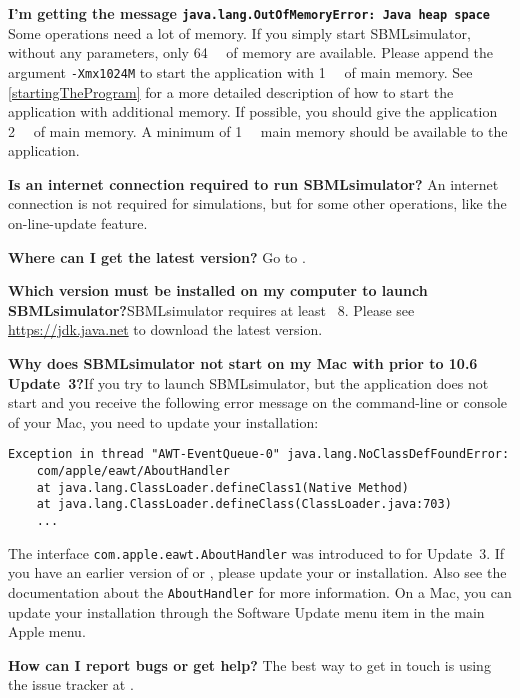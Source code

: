 \noindent \textbf{I'm getting the message \texttt{java.lang.OutOfMemoryError: Java heap space}}\newline
Some operations need a lot of memory. If you simply start SBMLsimulator, without any
\JVM parameters, only \SI{64}{\mega\byte} of memory are available.
Please append the argument \texttt{-Xmx1024M} to start the application with \SI{1}{\giga\byte} of main memory.
See \cref{startingTheProgram} for a more detailed description of how to start the application with additional memory.
If possible, you should give the application \SI{2}{\giga\byte} of main memory.
A minimum of \SI{1}{\giga\byte} main memory should be available to the application.\newline

\noindent \textbf{Is an internet connection required to run SBMLsimulator?}\newline
An internet connection is not required for simulations, but for some other operations,
like the on-line-update feature.\newline

\noindent \textbf{Where can I get the latest version?}\newline
Go to .\newline

\noindent \textbf{Which \Java version must be installed on my computer to launch
SBMLsimulator?}\newline SBMLsimulator requires at least \Java~8.
Please see \url{https://jdk.java.net} to download the latest \Java version.\newline

\noindent \textbf{Why does SBMLsimulator not start on my Mac with \MacOSX prior to
10.6 Update~3?}\newline If you try to launch SBMLsimulator, but the application does
not start and you receive the following error message on the command-line or
\Java console of your Mac, you need to update your \Java installation:
\begin{verbatim}
Exception in thread "AWT-EventQueue-0" java.lang.NoClassDefFoundError:
    com/apple/eawt/AboutHandler
    at java.lang.ClassLoader.defineClass1(Native Method)
    at java.lang.ClassLoader.defineClass(ClassLoader.java:703)
    ...
\end{verbatim}
The interface \texttt{com.apple.eawt.AboutHandler} was introduced to \Java for
 Update~3. If you have an earlier version of \MacOSX or \Java,
please update your \OS or \Java installation. Also see the \MacOSX documentation
about the \texttt{AboutHandler} for more information. On a Mac, you can update
your \Java installation through the Software Update menu item in the main Apple
menu.\newline

\noindent \textbf{How can I report bugs or get help?}\newline
The best way to get in touch is using the issue tracker at .
